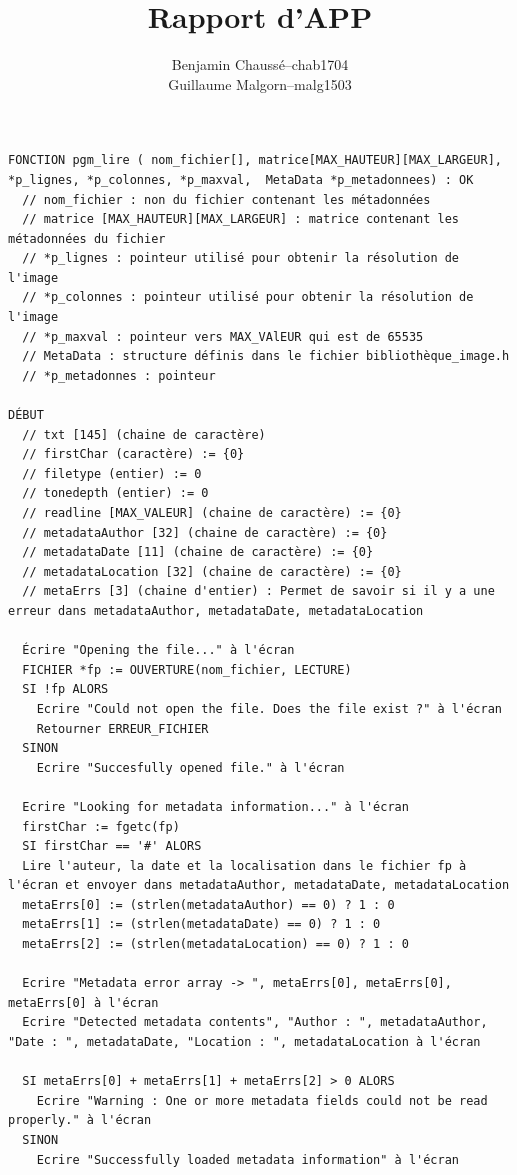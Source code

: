 \documentclass[a11paper, 11pt]{article}
\title{Rapport d'APP}
\author{
  \addtolength{\tabcolsep}{-0.4em}
  \begin{tabular}{rcl} %
  Benjamin Chaussé     & -- & chab1704 \\
  Guillaume Malgorn    & -- & malg1503 \\
  \end{tabular}
}
\begin{document}
\maketitle
\newpage


\begin{lstlisting}[caption=Pseudocode de la fonction findChar]
FONCTION pgm_lire ( nom_fichier[], matrice[MAX_HAUTEUR][MAX_LARGEUR], *p_lignes, *p_colonnes, *p_maxval,  MetaData *p_metadonnees) : OK
  // nom_fichier : non du fichier contenant les métadonnées
  // matrice [MAX_HAUTEUR][MAX_LARGEUR] : matrice contenant les métadonnées du fichier
  // *p_lignes : pointeur utilisé pour obtenir la résolution de l'image
  // *p_colonnes : pointeur utilisé pour obtenir la résolution de l'image
  // *p_maxval : pointeur vers MAX_VAlEUR qui est de 65535
  // MetaData : structure définis dans le fichier bibliothèque_image.h
  // *p_metadonnes : pointeur

DÉBUT
  // txt [145] (chaine de caractère)
  // firstChar (caractère) := {0}
  // filetype (entier) := 0
  // tonedepth (entier) := 0
  // readline [MAX_VALEUR] (chaine de caractère) := {0}
  // metadataAuthor [32] (chaine de caractère) := {0}
  // metadataDate [11] (chaine de caractère) := {0}
  // metadataLocation [32] (chaine de caractère) := {0}
  // metaErrs [3] (chaine d'entier) : Permet de savoir si il y a une erreur dans metadataAuthor, metadataDate, metadataLocation

  Écrire "Opening the file..." à l'écran
  FICHIER *fp := OUVERTURE(nom_fichier, LECTURE)
  SI !fp ALORS
    Ecrire "Could not open the file. Does the file exist ?" à l'écran
    Retourner ERREUR_FICHIER
  SINON
    Ecrire "Succesfully opened file." à l'écran

  Ecrire "Looking for metadata information..." à l'écran
  firstChar := fgetc(fp)
  SI firstChar == '#' ALORS
  Lire l'auteur, la date et la localisation dans le fichier fp à l'écran et envoyer dans metadataAuthor, metadataDate, metadataLocation
  metaErrs[0] := (strlen(metadataAuthor) == 0) ? 1 : 0
  metaErrs[1] := (strlen(metadataDate) == 0) ? 1 : 0
  metaErrs[2] := (strlen(metadataLocation) == 0) ? 1 : 0

  Ecrire "Metadata error array -> ", metaErrs[0], metaErrs[0], metaErrs[0] à l'écran
  Ecrire "Detected metadata contents", "Author : ", metadataAuthor, "Date : ", metadataDate, "Location : ", metadataLocation à l'écran

  SI metaErrs[0] + metaErrs[1] + metaErrs[2] > 0 ALORS
    Ecrire "Warning : One or more metadata fields could not be read properly." à l'écran
  SINON
    Ecrire "Successfully loaded metadata information" à l'écran


\end{lstlisting}
\end{document}
